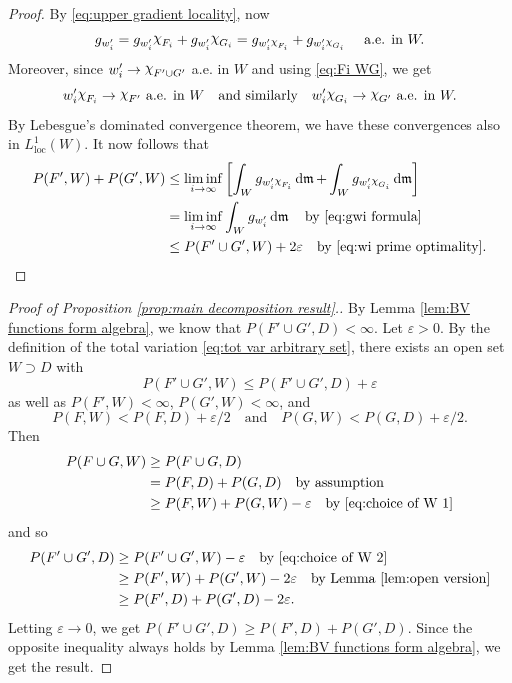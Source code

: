 \documentclass[11pt]{article}
\numberwithin{equation}{section}
\theoremstyle{plain}
\theoremstyle{definition}
\numberwithin{equation}{section}
\newcommand{\eps}{\varepsilon}
\newcommand{\loc}{\mathrm{loc}}
\newcommand{\ch}{\text{\raise 1.3pt \hbox{$\chi$}\kern-0.2pt}}
\DeclareMathOperator{\dfrm}{d\mathfrak{m}}
\begin{document}
\begin{proof}
By \eqref{eq:upper gradient locality}, now
\begin{equation}\label{eq:gwi formula}
g_{w_i'}=g_{w_i'}\ch_{F_i}+g_{w_i'}\ch_{G_i}=g_{ w_i'\ch_{F_i}}+g_{ w_i'\ch_{G_i}}\quad\textrm{ a.e. in }W.
\end{equation}
Moreover, since $w_i'\to \ch_{F'\cup G'}$ a.e. in $W$ and using \eqref{eq:Fi WG}, we get
\begin{equation}\label{eq:wi char function convergence}
w'_i \ch_{F_i}\to \ch_{F'}\textrm{ a.e. in }W\quad 
\textrm{and similarly}\quad w'_i \ch_{G_i}\to\ch_{G'}\textrm{ a.e. in }W.
\end{equation}
By Lebesgue's dominated convergence theorem, we have these convergences also in $L_{\loc}^1(W)$.
It now follows that
\begin{align*}
P(F',W)+P(G',W)
&\le \liminf_{i\to\infty}\left[\int_{W} g_{w_i' \ch_{F_i} }\dfrm +\int_{W} g_{ w_i'\ch_{G_i}}\dfrm \right]\\
&=\liminf_{i\to\infty}\int_W g_{w_i'}\dfrm\quad
\textrm{by }\eqref{eq:gwi formula}\\
&\le P(F'\cup G',W)+2\eps\quad\textrm{by }\eqref{eq:wi prime optimality}.
\end{align*}
\end{proof}

\begin{proof}[Proof of Proposition \ref{prop:main decomposition result}.]
By Lemma \ref{lem:BV functions form algebra}, we know that $P(F'\cup G',D)<\infty$.
Let $\eps>0$.
By the definition of the total variation \eqref{eq:tot var arbitrary set}, there exists an open set
$W\supset D$ with
\begin{equation}\label{eq:choice of W 2}
	P(F'\cup G',W)\le P(F'\cup G',D)+\eps
\end{equation}
as well as
$P(F',W)<\infty$, $P(G',W)<\infty$, and
\begin{equation}\label{eq:choice of W 1}
	P(F,W) < P(F,D)+\eps/2\quad\textrm{and}\quad P(G,W) < P(G,D)+\eps/2.
\end{equation}
Then
\begin{align*}
P(F\cup G,W)
&\ge P(F\cup G,D)\\
&= P(F,D)+P(G,D)\quad\textrm{by assumption}\\
&\ge P(F,W)+P(G,W)-\eps\quad\textrm{by }\eqref{eq:choice of W 1}
\end{align*}	
and so
\begin{align*}
P(F'\cup G',D)
&\ge P(F'\cup G',W)-\eps\quad\textrm{by }\eqref{eq:choice of W 2}\\
&\ge P(F',W)+P(G',W)-2\eps\quad\textrm{by Lemma }\ref{lem:open version}\\
&\ge P(F',D)+P(G',D)-2\eps.
\end{align*}
Letting $\eps\to 0$, we get $P(F'\cup G',D)\ge P(F',D)+P(G',D)$. Since the opposite inequality always holds
by Lemma \ref{lem:BV functions form algebra}, we get the result.
\end{proof}
\end{document}
